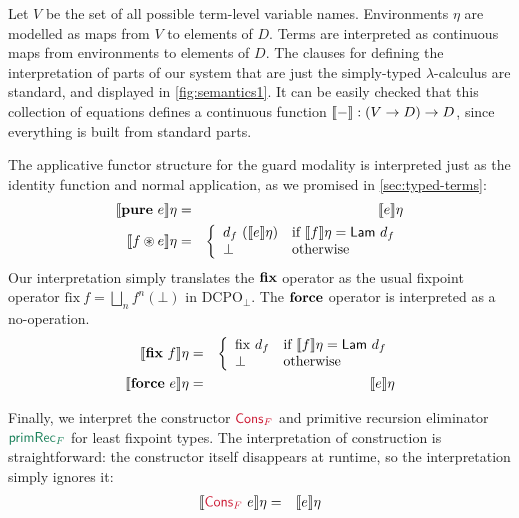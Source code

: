 Let $V$ be the set of all possible term-level variable
names. Environments $\eta$ are modelled as maps from $V$ to elements
of $D$. Terms are interpreted as continuous maps from environments to
elements of $D$. The clauses for defining the interpretation of parts
of our system that are just the simply-typed $\lambda$-calculus are
standard, and displayed in \autoref{fig:semantics1}. It can be easily
checked that this collection of equations defines a continuous
function $\llbracket - \rrbracket : (V \to D) \to D$, since everything is built from
standard parts.

The applicative functor structure for the guard modality is
interpreted just as the identity function and normal application, as
we promised in \autoref{sec:typed-terms}:
\begin{eqnarray*}
  \sem{\kw{pure}\ e}\eta & = & \sem{e}\eta \\
  \sem{f \circledast e}\eta & = & \left\{
    \begin{array}{ll}
      d_f\ (\sem{e}\eta) & \textrm{if}\ \sem{f}\eta = \semCons{Lam}\ d_f \\
      \bot & \textrm{otherwise}
    \end{array}
  \right.
\end{eqnarray*}
Our interpretation simply translates the $\textbf{fix}$ operator as the
usual fixpoint operator $\mathrm{fix}\ f = \bigsqcup_n f^n(\bot)$ in
$\mathrm{DCPO}_\bot$. The $\textbf{force}$ operator is interpreted as a
no-operation.
\begin{eqnarray*}
  \sem{\kw{fix}\ f}\eta & = &
  \left\{
    \begin{array}{ll}
      \mathrm{fix}\ d_f & \textrm{if }\sem{f}\eta = \semCons{Lam}\ d_f \\
      \bot & \textrm{otherwise}
    \end{array}
  \right.\\
  \sem{\kw{force}\ e}\eta & = & \sem{e}\eta
\end{eqnarray*}

Finally, we interpret the constructor $\cons{Cons$_F$}$ and primitive
recursion eliminator $\elim{primRec$_F$}$ for least fixpoint
types. The interpretation of construction is straightforward: the
constructor itself disappears at runtime, so the interpretation simply
ignores it:
\begin{eqnarray*}
  \sem{\cons{Cons$_F$}\ e}\eta & = & \sem{e}\eta
\end{eqnarray*}

